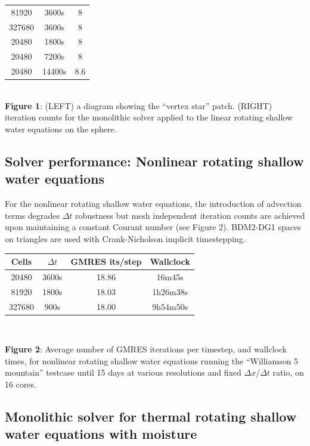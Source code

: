 \documentclass[
]{ImperialPoster}
\begin{document}
\begin{multicols}{3}
\begin{center}
\begin{tabular}{ccc}
    81920 & 3600s & 8 \\
    327680 & 3600s & 8 \\
    20480 & 1800s & 8 \\
    20480 & 7200s & 8 \\
    20480 & 14400s & 8.6 \\
  \end{tabular} \\
  \vspace{2mm}
  {\bfseries Figure 1}: (LEFT) a diagram showing the ``vertex star'' patch. (RIGHT)
  iteration counts for the monolithic solver applied to the linear
  rotating shallow water equations on the sphere.
  \end{center}
  \vspace{-5mm}
    \subsection{Solver performance: Nonlinear rotating shallow water equations}
For the nonlinear rotating shallow water equations, the introduction
of advection terms degrades $\Delta t$ robustness but mesh independent
iteration counts are achieved upon maintaining a constant Courant
number (see Figure 2). BDM2-DG1 spaces on triangles are used
with Crank-Nicholson implicit timestepping.

  \begin{tabular}{cccc}
    Cells & $\Delta t$ & GMRES its/step & Wallclock \\
    \hline
    20480 & 3600s & 18.86 & 16m45s \\
    81920 & 1800s & 18.03 & 1h26m38s \\
    327680 & 900s & 18.00 & 9h54m50s \\
  \end{tabular} \\
  \begin{center}
      \vspace{-8mm} {\bfseries Figure 2}: Average number of GMRES
      iterations per timestep, and wallclock times, for nonlinear
      rotating shallow water equations running the ``Williamson 5
      mountain'' testcase until 15 days at various resolutions and
      fixed $\Delta x/\Delta t$ ratio, on 16 cores.
  \end{center}
  \vspace{-5mm}
\subsection{Monolithic solver for thermal rotating shallow water
  equations with moisture}


\end{multicols}
\end{document}
